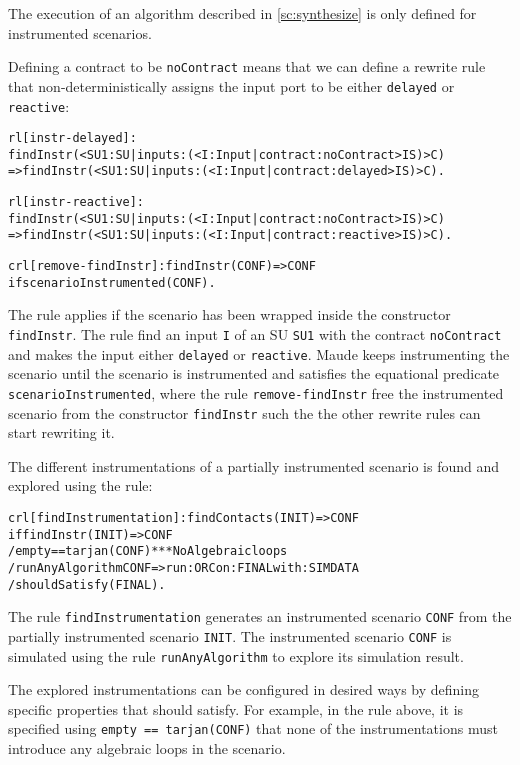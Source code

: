 The execution of an algorithm described in \cref{sc:synthesize} is only defined for instrumented scenarios.

Defining a contract to be \texttt{noContract} means that we can define a rewrite rule that non-deterministically assigns the input port to be either \texttt{delayed} or \texttt{reactive}:
\scriptsize
\begin{alltt}
rl [instr-delayed]: 
  findInstr(< SU1 : SU | inputs : (< I : Input | contract : noContract > IS) > C)
  => findInstr(< SU1 : SU | inputs : (< I : Input | contract : delayed > IS) > C) .

rl [instr-reactive]: 
  findInstr(< SU1 : SU | inputs : (< I : Input | contract :   noContract > IS) > C)
  => findInstr(< SU1 : SU | inputs : (< I : Input | contract : reactive > IS) > C) .

crl [remove-findInstr]: findInstr(CONF) => CONF 
  if scenarioInstrumented(CONF) .
\end{alltt}
\normalsize
The rule applies if the scenario has been wrapped inside the constructor \texttt{findInstr}.
The rule find an input \texttt{I} of an SU \texttt{SU1} with the contract \texttt{noContract} and makes the input either \texttt{delayed} or \texttt{reactive}.
Maude keeps instrumenting the scenario until the scenario is instrumented and satisfies the equational predicate \texttt{scenarioInstrumented}, where the rule \texttt{remove-findInstr} free the instrumented scenario from the constructor \texttt{findInstr} such the the other rewrite rules can start rewriting it.

The different instrumentations of a partially instrumented scenario is found and explored using the rule:

\small
\begin{alltt}
crl [findInstrumentation]: findContacts(INIT) => CONF
    if findInstr(INIT) => CONF
    / empty == tarjan(CONF) *** No Algebraic loops
    / runAnyAlgorithm CONF => run: ORC on: FINAL with: SIMDATA
    / shouldSatisfy(FINAL) .
\end{alltt}
\normalsize
The rule \texttt{findInstrumentation} generates an instrumented scenario \texttt{CONF} from the partially instrumented scenario \texttt{INIT}.
The instrumented scenario \texttt{CONF} is simulated using the rule \texttt{runAnyAlgorithm} to explore its simulation result.

The explored instrumentations can be configured in desired ways by defining specific properties that should satisfy.
For example, in the rule above, it is specified using \texttt{empty == tarjan(CONF)} that none of the instrumentations must introduce any algebraic loops in the scenario.

